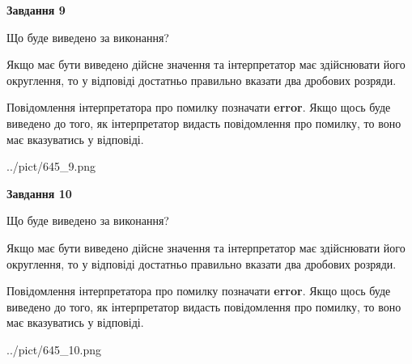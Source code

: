 \documentclass[12pt, ukrainian]{article}
\begin{document}
{\begin {Large}
{\begin {center}\textbf{Завдання 9}\end {center}}\par
Що буде виведено за виконання? \par

Якщо має бути виведено дійсне значення та інтерпретатор має здійснювати його округлення, 
то у відповіді достатньо правильно вказати два дробових розряди.

Повідомлення інтерпретатора про помилку позначати \textbf{error}.
Якщо щось буде виведено до того, як інтерпретатор видасть повідомлення про помилку, 
то воно має вказуватись у відповіді. \par

\begin{center}
	{../pict/645_9.png}
\end{center}
\newpage

{\begin {center}\textbf{Завдання 10}\end {center}}\par
Що буде виведено за виконання? \par

Якщо має бути виведено дійсне значення та інтерпретатор має здійснювати його округлення, 
то у відповіді достатньо правильно вказати два дробових розряди.

Повідомлення інтерпретатора про помилку позначати \textbf{error}.
Якщо щось буде виведено до того, як інтерпретатор видасть повідомлення про помилку, 
то воно має вказуватись у відповіді. \par

\begin{center}
	{../pict/645_10.png}
\end{center}
\newpage

\end {Large}}
\end{document}
